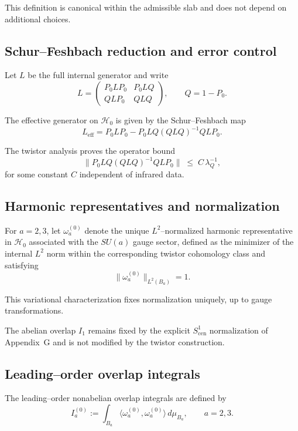 \documentclass[11pt]{article}
\begin{document}
This definition is canonical within the admissible slab and does not depend
on additional choices.

\subsection{Schur--Feshbach reduction and error control}

Let $L$ be the full internal generator and write
\[
L =
\begin{pmatrix}
P_0 L P_0 & P_0 L Q \\
Q L P_0 & Q L Q
\end{pmatrix},
\qquad Q=1-P_0.
\]

The effective generator on $\mathcal H_0$ is given by the Schur--Feshbach map
\[
L_{\mathrm{eff}}
=
P_0 L P_0
-
P_0 L Q (Q L Q)^{-1} Q L P_0.
\]

The twistor analysis proves the operator bound
\[
\|P_0 L Q (Q L Q)^{-1} Q L P_0\|
\;\le\;
C\,\lambda_Q^{-1},
\]
for some constant $C$ independent of infrared data.

\subsection{Harmonic representatives and normalization}

\begin{definition}
For $a=2,3$, let $\omega_a^{(0)}$ denote the unique $L^2$--normalized
harmonic representative in $\mathcal H_0$ associated with the $SU(a)$
gauge sector, defined as the minimizer of the internal $L^2$ norm within
the corresponding twistor cohomology class and satisfying
\[
\|\omega_a^{(0)}\|_{L^2(B_a)} = 1.
\]
\end{definition}

This variational characterization fixes normalization uniquely, up to
gauge transformations.

\begin{remark}
The abelian overlap $I_1$ remains fixed by the explicit $S^1_{\mathrm{cen}}$
normalization of Appendix~G and is not modified by the twistor construction.
\end{remark}

\subsection{Leading--order overlap integrals}

\begin{definition}
The leading--order nonabelian overlap integrals are defined by
\[
I_a^{(0)} := \int_{B_a}
\langle \omega_a^{(0)}, \omega_a^{(0)} \rangle \, d\mu_{B_a},
\qquad a=2,3.
\]
\end{definition}
\end{document}
